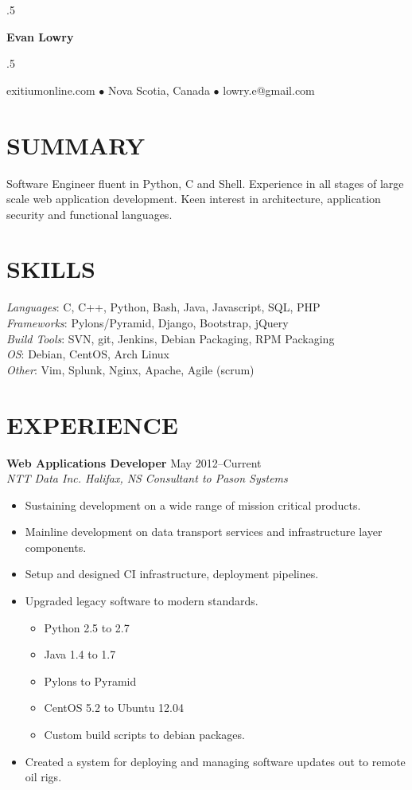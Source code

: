 \documentclass[line,margin]{res}
\begin{document}
\moveleft.5\hoffset\centerline{\LARGE\bf Evan Lowry}
\moveleft.5\hoffset\centerline{exitiumonline.com   {$\bullet$}   Nova Scotia, Canada {$\bullet$}   lowry.e@gmail.com}
 
\begin{resume}
\section{SUMMARY}
Software Engineer fluent in Python, C and Shell. Experience in all stages of
large scale web application development. Keen interest in architecture, 
application security and functional languages.

\section{SKILLS}
\textit{Languages}: C, C++, Python, Bash, Java, Javascript, SQL, PHP \\
\textit{Frameworks}: Pylons/Pyramid, Django, Bootstrap, jQuery \\
\textit{Build Tools}: SVN, git, Jenkins, Debian Packaging, RPM Packaging \\
\textit{OS}: Debian, CentOS, Arch Linux \\
\textit{Other}: Vim, Splunk, Nginx, Apache, Agile (scrum)

\section{EXPERIENCE}
\textbf{Web Applications Developer} \hfill May 2012--Current \\
\textit{NTT Data Inc. Halifax, NS} \hfill \textit{Consultant to Pason Systems}
\begin{itemize} \itemsep-2pt
    \item Sustaining development on a wide range of mission critical products.
    \item Mainline development on data transport services and infrastructure layer components.
    \item Setup and designed CI infrastructure, deployment pipelines.
    \item Upgraded legacy software to modern standards.
        \begin{itemize} \itemsep-2pt
            \item Python 2.5 to 2.7
            \item Java 1.4 to 1.7
            \item Pylons to Pyramid
            \item CentOS 5.2 to Ubuntu 12.04
            \item Custom build scripts to debian packages.
        \end{itemize}
    \item Created a system for deploying and managing software updates out to remote oil rigs.
\end{itemize}


\end{resume}
\end{document}
